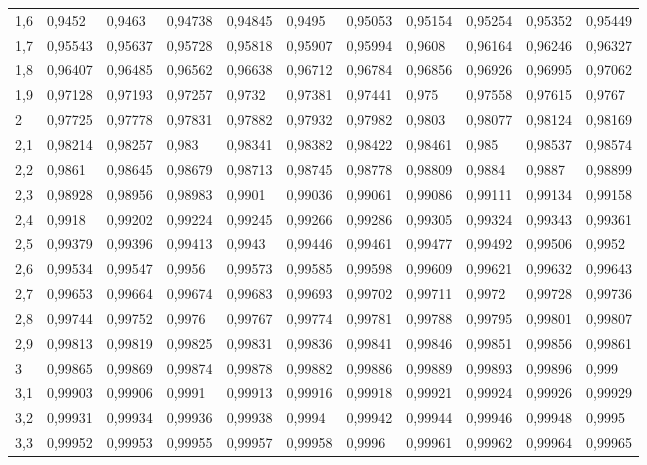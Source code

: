 \documentclass[spanish, 11pt]{exam}
\begin{document}
\begin{center}
\begin{tabular}{l|llllllllll}
1,6 & 0,9452  & 0,9463  & 0,94738 & 0,94845 & 0,9495  & 0,95053 & 0,95154 & 0,95254 & 0,95352 & 0,95449 \\
1,7 & 0,95543 & 0,95637 & 0,95728 & 0,95818 & 0,95907 & 0,95994 & 0,9608  & 0,96164 & 0,96246 & 0,96327 \\
1,8 & 0,96407 & 0,96485 & 0,96562 & 0,96638 & 0,96712 & 0,96784 & 0,96856 & 0,96926 & 0,96995 & 0,97062 \\
1,9 & 0,97128 & 0,97193 & 0,97257 & 0,9732  & 0,97381 & 0,97441 & 0,975   & 0,97558 & 0,97615 & 0,9767  \\
2   & 0,97725 & 0,97778 & 0,97831 & 0,97882 & 0,97932 & 0,97982 & 0,9803  & 0,98077 & 0,98124 & 0,98169 \\
2,1 & 0,98214 & 0,98257 & 0,983   & 0,98341 & 0,98382 & 0,98422 & 0,98461 & 0,985   & 0,98537 & 0,98574 \\
2,2 & 0,9861  & 0,98645 & 0,98679 & 0,98713 & 0,98745 & 0,98778 & 0,98809 & 0,9884  & 0,9887  & 0,98899 \\
2,3 & 0,98928 & 0,98956 & 0,98983 & 0,9901  & 0,99036 & 0,99061 & 0,99086 & 0,99111 & 0,99134 & 0,99158 \\
2,4 & 0,9918  & 0,99202 & 0,99224 & 0,99245 & 0,99266 & 0,99286 & 0,99305 & 0,99324 & 0,99343 & 0,99361 \\
2,5 & 0,99379 & 0,99396 & 0,99413 & 0,9943  & 0,99446 & 0,99461 & 0,99477 & 0,99492 & 0,99506 & 0,9952  \\
2,6 & 0,99534 & 0,99547 & 0,9956  & 0,99573 & 0,99585 & 0,99598 & 0,99609 & 0,99621 & 0,99632 & 0,99643 \\
2,7 & 0,99653 & 0,99664 & 0,99674 & 0,99683 & 0,99693 & 0,99702 & 0,99711 & 0,9972  & 0,99728 & 0,99736 \\
2,8 & 0,99744 & 0,99752 & 0,9976  & 0,99767 & 0,99774 & 0,99781 & 0,99788 & 0,99795 & 0,99801 & 0,99807 \\
2,9 & 0,99813 & 0,99819 & 0,99825 & 0,99831 & 0,99836 & 0,99841 & 0,99846 & 0,99851 & 0,99856 & 0,99861 \\
3   & 0,99865 & 0,99869 & 0,99874 & 0,99878 & 0,99882 & 0,99886 & 0,99889 & 0,99893 & 0,99896 & 0,999   \\
3,1 & 0,99903 & 0,99906 & 0,9991  & 0,99913 & 0,99916 & 0,99918 & 0,99921 & 0,99924 & 0,99926 & 0,99929 \\
3,2 & 0,99931 & 0,99934 & 0,99936 & 0,99938 & 0,9994  & 0,99942 & 0,99944 & 0,99946 & 0,99948 & 0,9995  \\
3,3 & 0,99952 & 0,99953 & 0,99955 & 0,99957 & 0,99958 & 0,9996  & 0,99961 & 0,99962 & 0,99964 & 0,99965 \\

\end{tabular}
\end{center}
\end{document}
